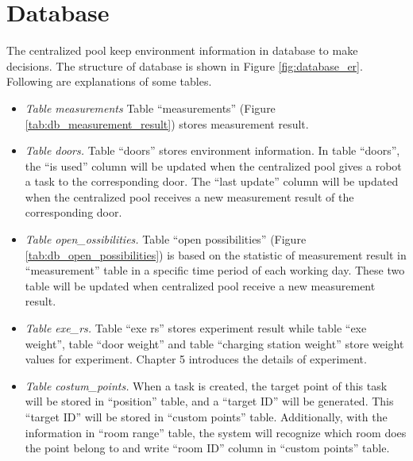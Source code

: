 \section{Database}
The centralized pool keep environment information in database to make decisions. The structure of database is shown in Figure \ref{fig:database_er}. Following are explanations of some tables.
\begin{itemize}
    \item \textsl{Table measurements} Table ``measurements'' (Figure \ref{tab:db_measurement_result}) stores measurement result.
    \item \textsl{Table doors.} Table ``doors'' stores environment information. In table ``doors'', the ``is used'' column will be updated when the centralized pool gives a robot a task to the corresponding door. The ``last update'' column will be updated when the centralized pool receives a new measurement result of the corresponding door. 
	\item \textsl{Table open\_ossibilities.} Table ``open possibilities'' (Figure \ref{tab:db_open_possibilities}) is based on the statistic of measurement result in ``measurement'' table in a specific time period of each working day. These two table will be updated when centralized pool receive a new measurement result. 
	\item \textsl{Table exe\_rs.} Table ``exe rs'' stores experiment result while table ``exe weight'', table ``door weight'' and table ``charging station weight'' store weight values for experiment. Chapter 5 introduces the details of experiment.
	\item \textsl{Table costum\_points.} When a task is created, the target point of this task will be stored in ``position'' table, and a ``target ID'' will be generated.  This ``target ID'' will be stored in ``custom points'' table. Additionally, with the information in ``room range'' table, the system will recognize which room does the point belong to and write ``room ID'' column in ``custom points'' table.
\end{itemize}

